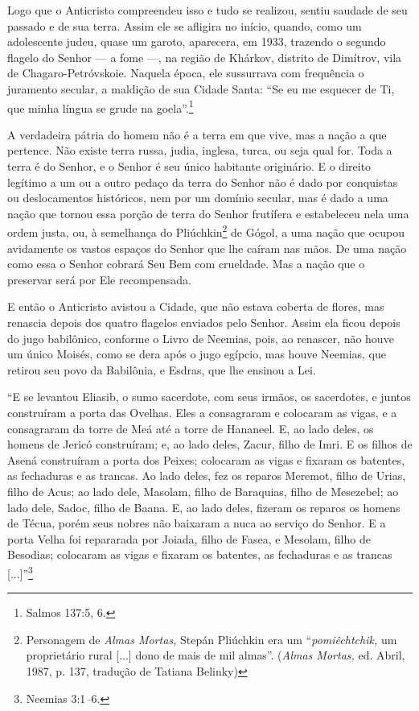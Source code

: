Logo que o Anticristo compreendeu isso e tudo se realizou, sentiu
saudade de seu passado e de sua terra. Assim ele se afligira no início,
quando, como um adolescente judeu, quase um garoto, aparecera, em 1933,
trazendo o segundo flagelo do Senhor --- a fome ---, na região de
Khárkov, distrito de Dimítrov, vila de Chagaro-Petróvskoie. Naquela
época, ele sussurrava com frequência o juramento secular, a maldição de
sua Cidade Santa: ``Se eu me esquecer de Ti, que minha língua se grude
na goela''.\footnote{Salmos 137:5, 6.}

A verdadeira pátria do homem não é a terra em que vive, mas a nação a
que pertence. Não existe terra russa, judia, inglesa, turca, ou seja
qual for. Toda a terra é do Senhor, e o Senhor é seu único habitante
originário. E o direito legítimo a um ou a outro pedaço da terra do
Senhor não é dado por conquistas ou deslocamentos históricos, nem por um
domínio secular, mas é dado a uma nação que tornou essa porção de terra
do Senhor frutífera e estabeleceu nela uma ordem justa, ou, à semelhança
do Pliúchkin\footnote{Personagem de \emph{Almas Mortas,} Stepán
  Pliúchkin era um ``\emph{pomiêchtchik,} um proprietário rural
  {[}...{]} dono de mais de mil almas''. (\emph{Almas Mortas,} ed.
  Abril, 1987, p. 137, tradução de Tatiana Belinky)} de Gógol, a uma
nação que ocupou avidamente os vastos espaços do Senhor que lhe caíram
nas mãos. De uma nação como essa o Senhor cobrará Seu Bem com crueldade.
Mas a nação que o preservar será por Ele recompensada.

E então o Anticristo avistou a Cidade, que não estava coberta de flores,
mas renascia depois dos quatro flagelos enviados pelo Senhor. Assim ela
ficou depois do jugo babilônico, conforme o Livro de Neemias, pois, ao
renascer, não houve um único Moisés, como se dera após o jugo egípcio,
mas houve Neemias, que retirou seu povo da Babilônia, e Esdras, que lhe
ensinou a Lei.

``E se levantou Eliasib, o sumo sacerdote, com seus irmãos, os
sacerdotes, e juntos construíram a porta das Ovelhas. Eles a consagraram
e colocaram as vigas, e a consagraram da torre de Meá até a torre de
Hananeel. E, ao lado deles, os homens de Jericó construíram; e, ao lado
deles, Zacur, filho de Imri. E os filhos de Asená construíram a porta
dos Peixes; colocaram as vigas e fixaram os batentes, as fechaduras e as
trancas. Ao lado deles, fez os reparos Meremot, filho de Urias, filho de
Acus; ao lado dele, Masolam, filho de Baraquias, filho de Mesezebel; ao
lado dele, Sadoc, filho de Baana. E, ao lado deles, fizeram os reparos
os homens de Técua, porém seus nobres não baixaram a nuca ao serviço do
Senhor. E a porta Velha foi repararada por Joiada, filho de Fasea, e
Mesolam, filho de Besodias; colocaram as vigas e fixaram os batentes, as
fechaduras e as trancas {[}...{]}''\footnote{Neemias 3:1\emph{--}6.}

